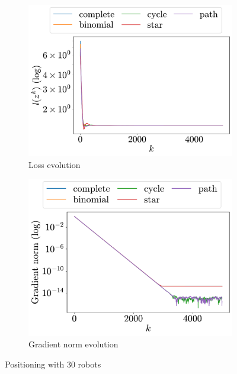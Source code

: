 \documentclass[a4paper,11pt,oneside]{book}
\begin{document}
\begin{figure}[H]
      \centering
      \begin{subfigure}[t]{0.48\linewidth}
            \centering
            \includegraphics[width=\linewidth]{./figs/aggregative/lots_agents/loss.pdf} 
            \caption{Loss evolution}
      \end{subfigure}
      \hfill
      \begin{subfigure}[t]{0.48\linewidth}
            \centering
            \includegraphics[width=\linewidth]{./figs/aggregative/lots_agents/gradient.pdf} 
            \caption{Gradient norm evolution}
      \end{subfigure}
      \caption{Positioning with $30$ robots}
      \label{fig:positioning_30}
\end{figure}
\end{document}
